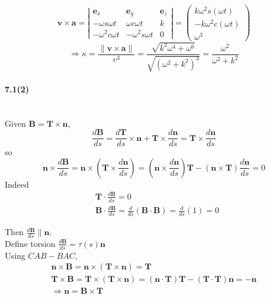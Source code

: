\[
\mathbf{v} \times \mathbf{a} = \left| \begin{matrix} \mathbf{e}_x & \mathbf{e}_y & \mathbf{e}_z \\ -\omega s{\omega t} & \omega c{\omega t} & k \\ - \omega^2 c{\omega t} & - \omega^2 s{\omega t} & 0 \end{matrix} \right| = \left( \begin{matrix} k \omega^2 s{(\omega t)} \\ - k \omega^2 c{( \omega t)} \\ \omega^3 \end{matrix} \right)
\]
\[
\Longrightarrow \kappa = \frac{ \| \mathbf{v} \times \mathbf{a} \| }{v^3} = \frac{ \sqrt{ k^2 \omega^4 + \omega^6} }{ \sqrt{ ( \omega^2 + k^2)^3 } } = \frac{ \omega^2}{ \omega^2 + k^2 }
\]

\paragraph{7.1(2)}\ \\

Given $\mathbf{B} = \mathbf{T} \times \mathbf{n}$, 
\[
\frac{d\mathbf{B}}{ ds } = \frac{ d\mathbf{T} }{ds} \times \mathbf{n} + \mathbf{T} \times \frac{d\mathbf{n}}{ ds} = \mathbf{T} \times \frac{d\mathbf{n}}{ ds}
\]
so
\[
\mathbf{n} \times \frac{d\mathbf{B}}{ds} = \mathbf{n} \times (\mathbf{T} \times \frac{d\mathbf{n}}{ds} ) = \left( \mathbf{n} \times \frac{d\mathbf{n}}{ds} \right) \mathbf{T} - (\mathbf{n} \times \mathbf{T}) \frac{d\mathbf{n}}{ds} = 0 
\]
Indeed
\[
\begin{aligned}
        & \mathbf{T} \cdot \frac{d\mathbf{B}}{ds} = 0 \\ 
        & \mathbf{B} \cdot \frac{d \mathbf{B}}{ds} = \frac{d}{ds} ( \mathbf{B}\cdot \mathbf{B}) = \frac{d}{ds}(1)= 0 
\end{aligned}
\]

Then $\frac{d\mathbf{B}}{ds} \parallel \mathbf{n}$. \\

Define torsion $\frac{d\mathbf{B}}{ds} = \tau(s) \mathbf{n}$\\

Using $CAB-BAC$,
\[
\begin{gathered}
        \mathbf{n} \times \mathbf{B} = \mathbf{n} \times (\mathbf{T} \times \mathbf{n} ) = \mathbf{T} \\ 
        \mathbf{T} \times \mathbf{B} = \mathbf{T} \times (\mathbf{T} \times \mathbf{n} ) = (\mathbf{n} \cdot \mathbf{T} ) \mathbf{T} - ( \mathbf{T} \cdot \mathbf{T} ) \mathbf{n} = - \mathbf{n} \\
        \Longrightarrow \mathbf{n} = \mathbf{B} \times \mathbf{T}
\end{gathered}
\]

